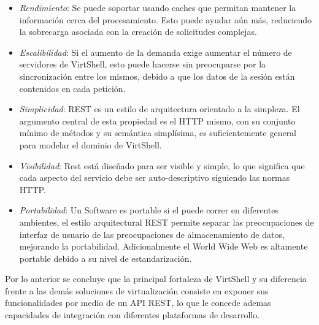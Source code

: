 \documentclass[conference, spanish]{IEEEtran}
\begin{document}
\begin{itemize}
\item \emph{Rendimiento}: Se puede soportar usando caches que permitan mantener la información cerca del procesamiento. Esto puede ayudar aún más, reduciendo la sobrecarga asociada con la creación de solicitudes complejas.
\item \emph{Escalibilidad}: Si el aumento de la demanda exige aumentar el número de servidores de VirtShell, esto puede hacerse sin preocuparse por la sincronización entre los mismos, debido a que los datos de la sesión están contenidos en cada petición.
\item \emph{Simplicidad}: REST es un estilo de arquitectura orientado a la simpleza. El argumento  central de esta propiedad es el HTTP mismo, con su conjunto mínimo de métodos y su semántica simplísima, es suficientemente general para modelar el dominio de VirtShell.
\item \emph{Visibilidad}: Rest está diseñado para ser visible y simple, lo que significa que cada aspecto del servicio debe ser auto-descriptivo siguiendo las normas HTTP.
\item \emph{Portabilidad}: Un Software es portable si el puede correr en diferentes ambientes, el estilo arquitectural REST permite separar las preocupaciones de interfaz de usuario de las preocupaciones de almacenamiento de datos, mejorando la portabilidad. Adicionalmente el World Wide Web es altamente portable debido a su nivel de estandarización.
\end{itemize}

Por lo anterior se concluye que la principal fortaleza de VirtShell y su diferencia frente a
 las demás soluciones de virtualización consiste en exponer sus funcionalidades por medio de un API REST, lo que le concede ademas capacidades de integración con diferentes plataformas de desarrollo.













\end{document}
